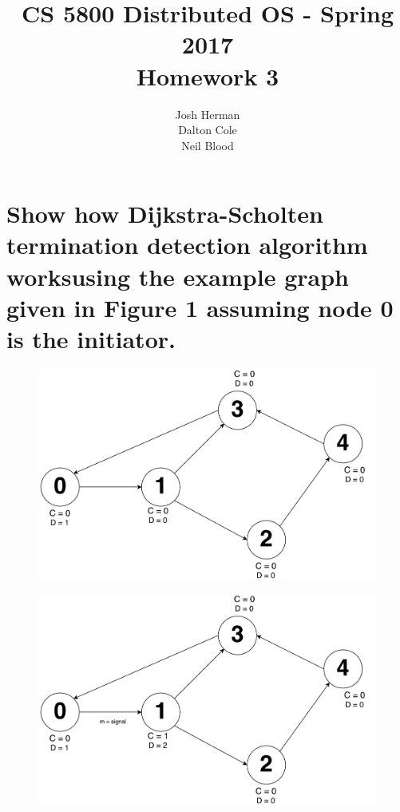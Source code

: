 \documentclass[times]{article}
\begin{document}
	\title{CS 5800 Distributed OS - Spring 2017 \\ Homework 3}
	\author{Josh Herman \\ Dalton Cole \\ Neil Blood}
	\date{}
	\maketitle

	\section{Show how Dijkstra-Scholten termination detection algorithm worksusing the example graph given in Figure 1 assuming node 0 is the initiator.}
		
		\begin{figure}[H]
			\includegraphics[width=\linewidth]{q2/1.pdf}
		\end{figure}
		\begin{figure}[H]
			\includegraphics[width=\linewidth]{q2/2.pdf}
		\end{figure}
\end{document}
